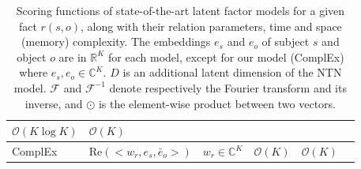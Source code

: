 \documentclass{article}
\newcommand{\complexSpace}{\mathbb{C}}
\renewcommand{\Re}{\mathbb{R}}
\newcommand{\C}{\complexSpace} %
\newcommand{\R}{\Re} %
\newcommand{\real}{\mathrm{Re}}
\begin{document}
\begin{table}[]
{\begin{tabular}{|l|l|l|l|l|l|}
        $\mathcal{O}(K\log K)$&
        $\mathcal{O}(K)$
        \\
        \hline
        ComplEx & 
        $\real(<w_r, e_s, \bar{e}_o>)$ &
        $w_r\in\complexSpace^{K}$&
        $\mathcal{O}(K)$& %
        $\mathcal{O}(K)$
        \\
        \hline
    \end{tabular}
    }
    \caption{
     Scoring functions of state-of-the-art latent factor models for a given fact $r(s,o)$, along with their relation parameters, time and space (memory) complexity. The embeddings $e_s$ and $e_o$ of subject $s$ and object $o$ are in $\R^K$ for each model, except for our model (ComplEx) where $e_s,e_o \in \C^K$.  $D$ is an additional latent dimension of the NTN model. 
    $\mathcal{F}$ and $\mathcal{F}^{-1}$ denote respectively the Fourier transform and its inverse, and $\odot$ is the element-wise product between two vectors.
    }
    \label{tab:scoring}
\end{table}
\end{document}
